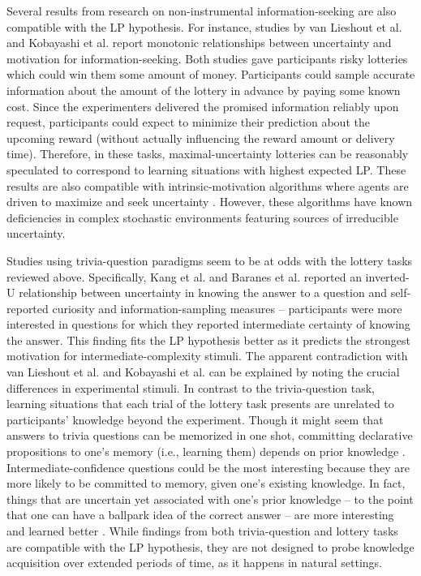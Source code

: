 Several results from research on non-instrumental information-seeking are also compatible with the \ac{LP} hypothesis. For instance, studies by van Lieshout et al. \cite{van_lieshout_induction_2018} and Kobayashi et al. \cite{kobayashi_diverse_2019} report monotonic relationships between uncertainty and motivation for information-seeking. Both studies gave participants risky lotteries which could win them some amount of money. Participants could sample accurate information about the amount of the lottery in advance by paying some known cost. Since the experimenters delivered the promised information reliably upon request, participants could expect to minimize their prediction about the upcoming reward (without actually influencing the reward amount or delivery time). Therefore, in these tasks, maximal-uncertainty lotteries can be reasonably speculated to correspond to learning situations with highest expected \ac{LP}. These results are also compatible with intrinsic-motivation algorithms where agents are driven to maximize and seek uncertainty \cite[see ][]{oudeyer_intrinsic_2007,linke_adapting_2020}. However, these algorithms have known deficiencies in complex stochastic environments featuring sources of irreducible uncertainty. 

Studies using trivia-question paradigms seem to be at odds with the lottery tasks reviewed above. Specifically, Kang et al. \cite{kang_wick_2009} and Baranes et al. \cite{baranes_eye_2015} reported an inverted-U relationship between uncertainty in knowing the answer to a question and self-reported curiosity and information-sampling measures -- participants were more interested in questions for which they reported intermediate certainty of knowing the answer. This finding fits the \ac{LP} hypothesis better as it predicts the strongest motivation for intermediate-complexity stimuli. The apparent contradiction with van Lieshout et al. \cite{van_lieshout_induction_2018} and Kobayashi et al. \cite{kobayashi_diverse_2019} can be explained by noting the crucial differences in experimental stimuli. In contrast to the trivia-question task, learning situations that each trial of the lottery task presents are unrelated to participants' knowledge beyond the experiment. Though it might seem that answers to trivia questions can be memorized in one shot, committing declarative propositions to one's memory (i.e., learning them) depends on prior knowledge \cite{brod_influence_2013}. Intermediate-confidence questions could be the most interesting because they are more likely to be committed to memory, given one's existing knowledge. In fact, things that are uncertain yet associated with one's prior knowledge -- to the point that one can have a ballpark idea of the correct answer -- are more interesting and learned better \cite{brod_lighting_2019}. While findings from both trivia-question and lottery tasks are compatible with the \ac{LP} hypothesis, they are not designed to probe knowledge acquisition over extended periods of time, as it happens in natural settings.

